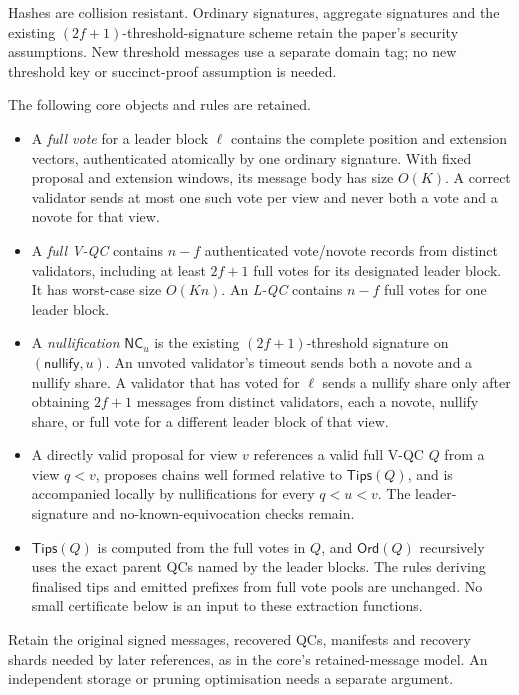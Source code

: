 \documentclass[11pt,a4paper]{article}
\theoremstyle{definition}
\newcommand{\NC}{\mathsf{NC}}
\newcommand{\Tips}{\mathsf{Tips}}
\newcommand{\Ord}{\mathsf{Ord}}
\begin{document}
Hashes are collision resistant. Ordinary signatures, aggregate signatures
and the existing \((2f+1)\)-threshold-signature scheme retain the paper's
security assumptions. New threshold messages use a separate domain tag; no
new threshold key or succinct-proof assumption is needed.

The following core objects and rules are retained.
\begin{itemize}
\item A \emph{full vote} for a leader block \(\ell\) contains the complete
  position and extension vectors, authenticated atomically by one ordinary
  signature. With fixed proposal and extension windows, its message body
  has size \(O(K)\). A correct validator sends at most one such vote per
  view and never both a vote and a novote for that view.
\item A \emph{full V-QC} contains \(n-f\) authenticated vote/novote records
  from distinct validators, including at least \(2f+1\) full votes for its
  designated leader block. It has worst-case size \(O(Kn)\).
  An \emph{L-QC} contains \(n-f\) full votes for one leader block.
\item A \emph{nullification} \(\NC_u\) is the existing
  \((2f+1)\)-threshold signature on \((\mathsf{nullify},u)\).
  An unvoted validator's timeout sends both a novote and a nullify share.
  A validator that has voted for \(\ell\) sends a nullify share only after
  obtaining \(2f+1\) messages from distinct validators, each a novote,
  nullify share, or full vote for a different leader block of that view.
\item A directly valid proposal for view \(v\) references a valid full
  V-QC \(Q\) from a view \(q<v\), proposes chains well formed relative to
  \(\Tips(Q)\), and is accompanied locally by nullifications for every
  \(q<u<v\). The leader-signature and no-known-equivocation checks remain.
\item \(\Tips(Q)\) is computed from the full votes in \(Q\), and
  \(\Ord(Q)\) recursively uses the exact parent QCs named by the leader
  blocks. The rules deriving finalised tips and emitted prefixes from full
  vote pools are unchanged. No small certificate below is an input to these
  extraction functions.
\end{itemize}

Retain the original signed messages, recovered QCs, manifests and recovery
shards needed by later references, as in the core's retained-message model.
An independent storage or pruning optimisation needs a separate argument.
\end{document}
